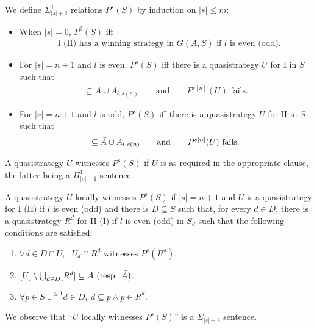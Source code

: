 \documentclass{beamer} %
\begin{document}

\begin{frame}
    \begin{definition}
        We define $\Sigma_{|s|+2}^1$ relations $P^s(S)$ by induction on $|s| \leq m$:
        \begin{itemize}
            \item When $|s|=0$, $P^{\emptyset}(S)$ iff \begin{align}
                &\text{I (II) has a winning strategy in } G(A,S) \text{ if } l \text{ is even (odd)}.\label{base}
            \end{align}
            \item For $|s|=n+1$ and $l$ is even, $P^{s}(S)$ iff there is a quasistrategy $U$ for I in $S$ such 
            that \begin{align}
                [U] \subseteq A \cup A_{l, s(n)} \qquad \text{and} \qquad 
                P^{s[n]}(U) \text{ fails}.\label{even}
            \end{align}
            \item For $|s|=n+1$ and $l$ is odd, $P^{s}(S)$ iff there is a quasistrategy $U$ for II in $S$ such 
            that \begin{align}
                [U] \subseteq \Bar{A} \cup A_{l, s(n)} \qquad \text{and} \qquad
                P^{s[n]}(U) \text{ fails}.\label{odd}
            \end{align}  
        \end{itemize}
        A quasistrategy $U$ witnesses $P^{s}(S)$ if $U$ is as required in the appropriate clause, the latter being 
        a $\Pi_{|s|+1}^1$ sentence.\label{P}
    \end{definition}
\end{frame}


\begin{frame}
    \begin{definition}
        A quasistrategy $U$ locally witnesses $P^s(S)$ if $|s| = n+1$ and $U$ is a quasistrategy for I (II) if 
        $l$ is even (odd) and there is $D \subseteq S$ such that, for every $d \in D$, there is a quasistrategy 
        $R^d$ for II (I) if $l$ is even (odd) in $S_d$ such that the following conditions are satisfied:
        \begin{enumerate}
            \item $\forall d \in D\cap U$, \ $U_d \cap R^d$ witnesses $P^s(R^d)$.
            \item $[U] \setminus \bigcup_{d \in D} [R^d] \subseteq A \ (\text{resp. }\Bar{A})$.
            \item $\forall p \in S \ \exists^{\leq 1} d \in D, \ d \subseteq p \land p \in R^d$.
        \end{enumerate}
        We observe that ``$U$ locally witnesses $P^s(S)$'' is a $\Sigma_{|s|+2}^1$ sentence.
    \end{definition}
\end{frame}
\end{document}
